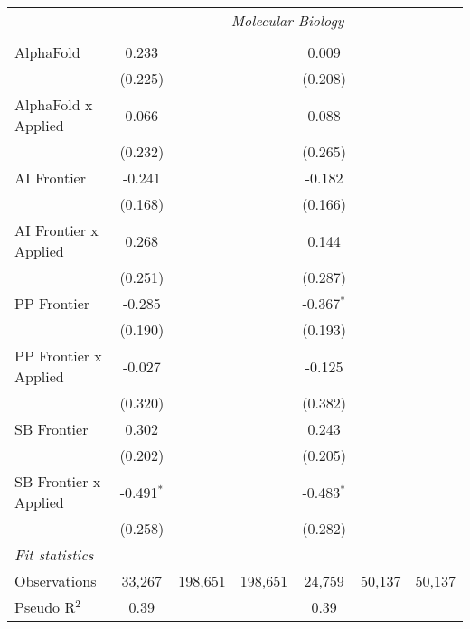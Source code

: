 \begin{tabular}{lcccccc}
 & \multicolumn{6}{c}{\textit{Molecular Biology}} \\ \\
   AlphaFold             & 0.233        &         &         & 0.009        &        &   \\   
                         & (0.225)      &         &         & (0.208)      &        &   \\   
   AlphaFold x Applied   & 0.066        &         &         & 0.088        &        &   \\   
                         & (0.232)      &         &         & (0.265)      &        &   \\   
   AI Frontier           & -0.241       &         &         & -0.182       &        &   \\   
                         & (0.168)      &         &         & (0.166)      &        &   \\   
   AI Frontier x Applied & 0.268        &         &         & 0.144        &        &   \\   
                         & (0.251)      &         &         & (0.287)      &        &   \\   
   PP Frontier           & -0.285       &         &         & -0.367$^{*}$ &        &   \\   
                         & (0.190)      &         &         & (0.193)      &        &   \\   
   PP Frontier x Applied & -0.027       &         &         & -0.125       &        &   \\   
                         & (0.320)      &         &         & (0.382)      &        &   \\   
   SB Frontier           & 0.302        &         &         & 0.243        &        &   \\   
                         & (0.202)      &         &         & (0.205)      &        &   \\   
   SB Frontier x Applied & -0.491$^{*}$ &         &         & -0.483$^{*}$ &        &   \\   
                         & (0.258)      &         &         & (0.282)      &        &   \\   
   \midrule
   \emph{Fit statistics}\\
   Observations          & 33,267       & 198,651 & 198,651 & 24,759       & 50,137 & 50,137\\  
   Pseudo R$^2$          & 0.39         &         &         & 0.39         &        & \\  
   

\end{tabular}
